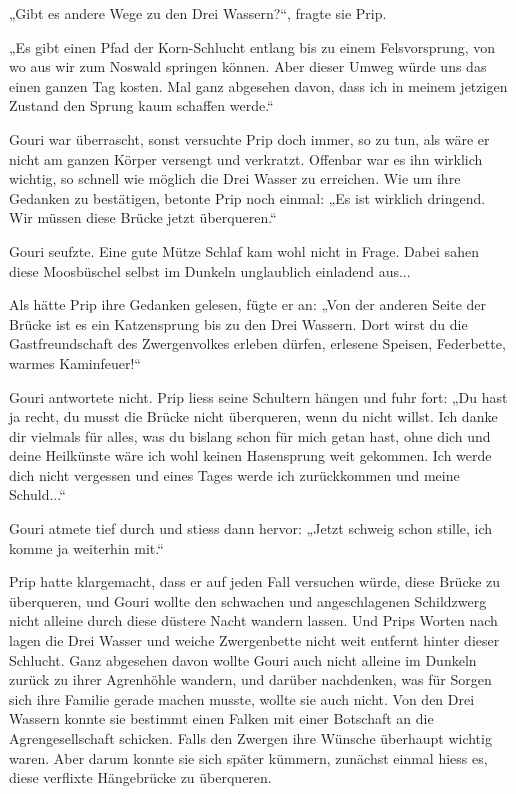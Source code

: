 „Gibt es andere Wege zu den Drei Wassern?“, fragte sie Prip.

„Es gibt einen Pfad der Korn-Schlucht entlang bis zu einem Felsvorsprung, von wo aus wir zum Noswald springen können. Aber dieser Umweg würde uns das einen ganzen Tag kosten. Mal ganz abgesehen davon, dass ich in meinem jetzigen Zustand den Sprung kaum schaffen werde.“

Gouri war überrascht, sonst versuchte Prip doch immer, so zu tun, als wäre er nicht am ganzen Körper versengt und verkratzt. Offenbar war es ihn wirklich wichtig, so schnell wie möglich die Drei Wasser zu erreichen. Wie um ihre Gedanken zu bestätigen, betonte Prip noch einmal: „Es ist wirklich dringend. Wir müssen diese Brücke jetzt überqueren.“

Gouri seufzte. Eine gute Mütze Schlaf kam wohl nicht in Frage. Dabei sahen diese Moosbüschel selbst im Dunkeln unglaublich einladend aus...

Als hätte Prip ihre Gedanken gelesen, fügte er an: „Von der anderen Seite der Brücke ist es ein Katzensprung bis zu den Drei Wassern. Dort wirst du die Gastfreundschaft des Zwergenvolkes erleben dürfen, erlesene Speisen, Federbette, warmes Kaminfeuer!“

Gouri antwortete nicht. Prip liess seine Schultern hängen und fuhr fort: „Du hast ja recht, du musst die Brücke nicht überqueren, wenn du nicht willst. Ich danke dir vielmals für alles, was du bislang schon für mich getan hast, ohne dich und deine Heilkünste wäre ich wohl keinen Hasensprung weit gekommen. Ich werde dich nicht vergessen und eines Tages werde ich zurückkommen und meine Schuld...“

Gouri atmete tief durch und stiess dann hervor: „Jetzt schweig schon stille, ich komme ja weiterhin mit.“

Prip hatte klargemacht, dass er auf jeden Fall versuchen würde, diese Brücke zu überqueren, und Gouri wollte den schwachen und angeschlagenen Schildzwerg nicht alleine durch diese düstere Nacht wandern lassen. Und Prips Worten nach lagen die Drei Wasser und weiche Zwergenbette nicht weit entfernt hinter dieser Schlucht. Ganz abgesehen davon wollte Gouri auch nicht alleine im Dunkeln zurück zu ihrer Agrenhöhle wandern, und darüber nachdenken, was für Sorgen sich ihre Familie gerade machen musste, wollte sie auch nicht. Von den Drei Wassern konnte sie bestimmt einen Falken mit einer Botschaft an die Agrengesellschaft schicken. Falls den Zwergen ihre Wünsche überhaupt wichtig waren. Aber darum konnte sie sich später kümmern, zunächst einmal hiess es, diese verflixte Hängebrücke zu überqueren.

